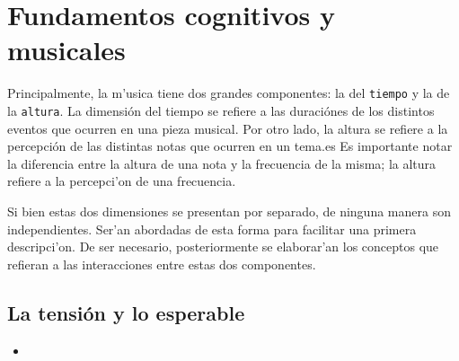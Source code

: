 \section{Fundamentos cognitivos y musicales}
\label{sec_cogn_bg}
Principalmente, la m'usica tiene dos grandes componentes: la del \texttt{tiempo} y la de la 
\texttt{altura}. La dimensi\'on del tiempo se refiere a las duraci\'ones de los distintos eventos que 
ocurren en una pieza musical. Por otro lado, la altura se refiere a la percepci\'on de las distintas notas que ocurren 
en un tema.es Es importante notar la diferencia entre la altura de una nota y la frecuencia de la misma; la altura refiere
a la percepci'on de una frecuencia.

Si bien estas dos dimensiones se presentan por separado, de ninguna manera son independientes. Ser'an abordadas de esta forma 
para facilitar una primera descripci'on. De ser necesario, posteriormente se elaborar'an los conceptos que refieran a las interacciones entre 
estas dos componentes. 

\subsection{La tensi\'on y lo esperable}
\label{subsec_tension}
\begin{itemize}
  \item 

\end{itemize}


